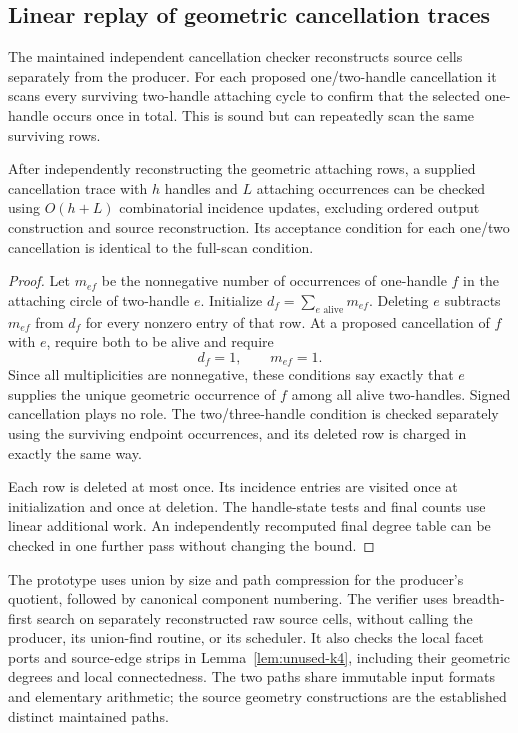 \subsection{Linear replay of geometric cancellation traces}

The maintained independent cancellation checker reconstructs source cells
separately from the producer.  For each proposed one/two-handle cancellation
it scans every surviving two-handle attaching cycle to confirm that the
selected one-handle occurs once in total.  This is sound but can repeatedly
scan the same surviving rows.

\begin{proposition}
\label{prop:unused-linear-replay}
After independently reconstructing the geometric attaching rows, a supplied
cancellation trace with $h$ handles and $L$ attaching occurrences can be
checked using $O(h+L)$ combinatorial incidence updates, excluding ordered
output construction and source reconstruction.  Its acceptance condition
for each one/two cancellation is identical to the full-scan condition.
\end{proposition}

\begin{proof}
Let $m_{ef}$ be the nonnegative number of occurrences of one-handle $f$
in the attaching circle of two-handle $e$.  Initialize
$d_f=\sum_{e\text{ alive}}m_{ef}$.  Deleting $e$ subtracts $m_{ef}$ from
$d_f$ for every nonzero entry of that row.  At a proposed cancellation
of $f$ with $e$, require both to be alive and require
\[
   d_f=1,\qquad m_{ef}=1.
\]
Since all multiplicities are nonnegative, these conditions say exactly
that $e$ supplies the unique geometric occurrence of $f$ among all alive
two-handles.  Signed cancellation plays no role.  The two/three-handle
condition is checked separately using the surviving endpoint occurrences,
and its deleted row is charged in exactly the same way.

Each row is deleted at most once.  Its incidence entries are visited once
at initialization and once at deletion.  The handle-state tests and final
counts use linear additional work.  An independently recomputed final
degree table can be checked in one further pass without changing the bound.
\end{proof}

The prototype uses union by size and path compression for the producer's
quotient, followed by canonical component numbering.  The verifier uses
breadth-first search on separately reconstructed raw source cells, without
calling the producer, its union-find routine, or its scheduler.  It also checks the local facet ports and source-edge strips in
Lemma~\ref{lem:unused-k4}, including their geometric degrees and local
connectedness.  The two paths share immutable input formats and elementary arithmetic; the source
geometry constructions are the established distinct maintained paths.

